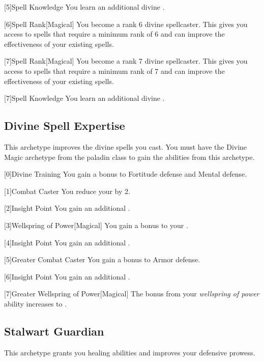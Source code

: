         [5]{Spell Knowledge} You learn an additional divine .

        [6]{Spell Rank}[Magical] You become a rank 6 divine spellcaster.
        This gives you access to spells that require a minimum rank of 6 and can improve the effectiveness of your existing spells.

        [7]{Spell Rank}[Magical] You become a rank 7 divine spellcaster.
        This gives you access to spells that require a minimum rank of 7 and can improve the effectiveness of your existing spells.

        [7]{Spell Knowledge} You learn an additional divine .

    \newpage
    \subsection{Divine Spell Expertise}
        This archetype improves the divine spells you cast.
        You must have the Divine Magic archetype from the paladin class to gain the abilities from this archetype.

        [0]{Divine Training} You gain a  bonus to Fortitude defense and Mental defense.

        [1]{Combat Caster} You reduce your  by 2.

        [2]{Insight Point} You gain an additional .

        [3]{Wellspring of Power}[Magical]
        You gain a  bonus to your  .

        [4]{Insight Point} You gain an additional .

        [5]{Greater Combat Caster} You gain a  bonus to Armor defense.

        [6]{Insight Point} You gain an additional .

        [7]{Greater Wellspring of Power}[Magical]
        The bonus from your \textit{wellspring of power} ability increases to .

    \newpage
    \subsection{Stalwart Guardian}
        This archetype grants you healing abilities and improves your defensive prowess.

